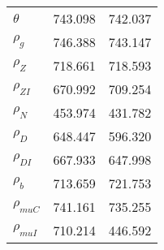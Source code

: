 \begin{center}
\begin{longtable}{lcc}
$ {\theta}             $	 & 	     743.098	 & 	     742.037 \\ 
$ {\rho_g}             $	 & 	     746.388	 & 	     743.147 \\ 
$ {\rho_Z}             $	 & 	     718.661	 & 	     718.593 \\ 
$ {\rho_{ZI}}          $	 & 	     670.992	 & 	     709.254 \\ 
$ {\rho_N}             $	 & 	     453.974	 & 	     431.782 \\ 
$ {\rho_D}             $	 & 	     648.447	 & 	     596.320 \\ 
$ {\rho_{DI}}          $	 & 	     667.933	 & 	     647.998 \\ 
$ {\rho_b}             $	 & 	     713.659	 & 	     721.753 \\ 
$ {\rho_{muC}}         $	 & 	     741.161	 & 	     735.255 \\ 
$ {\rho_{muI}}         $	 & 	     710.214	 & 	     446.592 \\ 
\end{longtable}
 \end{center}
